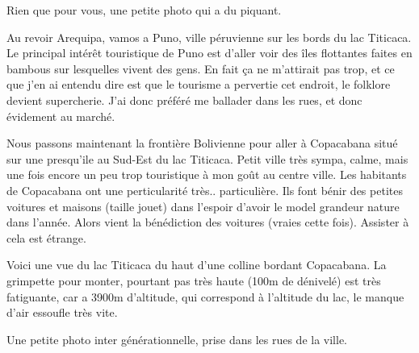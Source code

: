 \begin{multicols}{2}

Rien que pour vous, une petite photo qui a du piquant.


Au revoir Arequipa, vamos a Puno, ville péruvienne sur les bords du lac Titicaca. Le principal intérêt touristique de Puno est d'aller voir des îles flottantes faites en bambous sur lesquelles vivent des gens. En fait ça ne m'attirait pas trop, et ce que j'en ai entendu dire est que le tourisme a pervertie cet endroit, le folklore devient supercherie. J'ai donc préféré me ballader dans les rues, et donc évidement au marché.


Nous passons maintenant la frontière Bolivienne pour aller à Copacabana situé sur une presqu'ile au Sud-Est du lac Titicaca. Petit ville très sympa, calme, mais une fois encore un peu trop touristique à mon goût au centre ville. Les habitants de Copacabana ont une perticularité très.. particulière. Ils font bénir des petites voitures et maisons (taille jouet) dans l'espoir d'avoir le model grandeur nature dans l'année. Alors vient la bénédiction des voitures (vraies cette fois). Assister à cela est étrange.


Voici une vue du lac Titicaca du haut d'une colline bordant Copacabana. La grimpette pour monter, pourtant pas très haute (100m de dénivelé) est très fatiguante, car a 3900m d'altitude, qui correspond à l'altitude du lac, le manque d'air essoufle très vite.


Une petite photo inter générationnelle, prise dans les rues de la ville.


\end{multicols}
